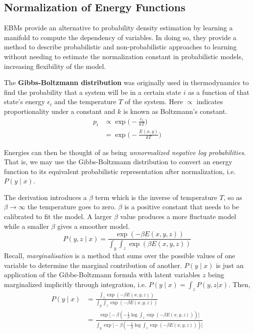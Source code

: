 \documentclass{article}
\begin{document}
\subsection{Normalization of Energy Functions}
EBMs provide an alternative to probability density estimation by learning a manifold to compute the dependency of variables. In doing so, they provide a method to describe probabilistic and non-probabilistic approaches to learning without needing to estimate the normalization constant in probabilistic models, increasing flexibility of the model.

The \textbf{Gibbs-Boltzmann distribution} was originally used in thermodynamics to find the probability that a system will be in a certain state $i$ as a function of that state's energy $\epsilon_i$ and the temperature $T$ of the system. Here $\propto$ indicates proportionality under a constant and $k$ is known as Boltzmann's constant.  
\begin{align*}
    p_{i} &\propto \exp \bigg ( -{\frac {\varepsilon_{i}}{kT}} \bigg )\\
     &= \exp \bigg( - \frac{E(x, y)}{kT} \bigg )
\end{align*}

Energies can then be thought of as being \textit{unnormalized negative log probabilities}. That is, we may use the Gibbs-Boltzmann distribution to convert an energy function to its equivalent probabilistic representation after normalization, i.e. $P(y \mid x)$. 

The derivation introduces a $\beta$ term which is the inverse of temperature $T$, so as $\beta \rightarrow \infty$ the temperature goes to zero. $\beta$ is a positive constant that needs to be calibrated to fit the model. A larger $\beta$ value produces a more fluctuate model while a smaller $\beta$ gives a smoother model. 
\[
    P(y, z \mid x) = \frac{\exp(-\beta E(x,y,z)) }{ \int_y \int_z \exp(\beta E(x, y, z))} 
\]
Recall, \textit{marginalisation} is a method that sums over the possible values of one variable to determine the marginal contribution of another. $P(y \mid x)$ is just an application of the Gibbs-Boltzmann formula with latent variables $z$ being marginalized implicitly through integration, i.e. $P(y \mid x) = \int_z P(y,z | x)$. Then,
\begin{align*}
    P(y \mid x) &= \frac{ \int_z \exp(-\beta E(x,y,z)) }{ \int_y \int_z \exp(-\beta E(x, y, z))} \\
    &= \frac{
        \exp \bigg [  -\beta (-\frac{1}{\beta} \log  \int_z \exp(-\beta E(x,y,z)) ) \bigg ]
    }{
        \int_y \exp \bigg [  -\beta (-\frac{1}{\beta} \log  \int_z \exp(-\beta E(x,y,z)) ) \bigg ]
    }
\end{align*}
\end{document}
